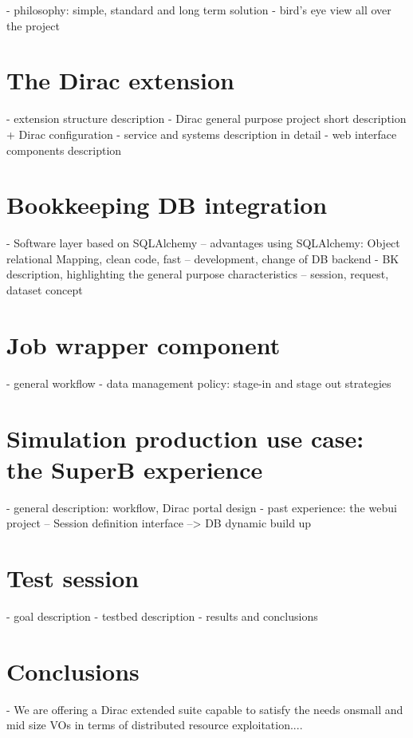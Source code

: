 \documentclass[a4paper]{jpconf}
\begin{document}
- philosophy: simple, standard and long term solution
- bird's eye view all over the project

 
\section{The Dirac extension} 

- extension structure description
- Dirac general purpose project short description + Dirac configuration
- service and systems description in detail
- web interface components description


\section{Bookkeeping DB integration}

- Software layer based on SQLAlchemy
-- advantages using SQLAlchemy: Object relational Mapping, clean code, fast
-- development, change of DB backend
- BK description, highlighting the general purpose characteristics
-- session, request, dataset concept

 
\section{Job wrapper component}

- general workflow
- data management policy: stage-in and stage out strategies
 
\section{Simulation production use case: the SuperB experience}

- general description: workflow, Dirac portal design
- past experience: the webui project
-- Session definition interface --> DB dynamic build up
 
\section{Test session}

- goal description
- testbed description
- results and conclusions

\section{Conclusions}

- We are offering a Dirac extended suite capable to satisfy the
needs onsmall and mid size VOs in terms of distributed
resource exploitation....
\end{document}
